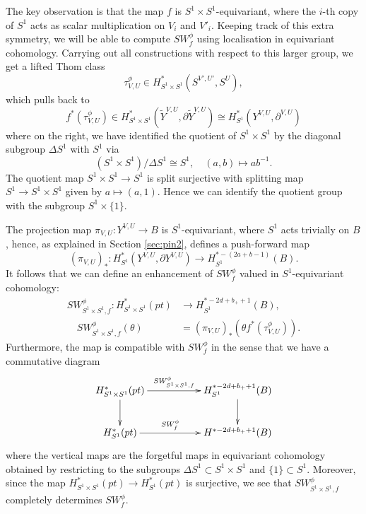 \documentclass{amsart}
\theoremstyle{definition}
\theoremstyle{remark}
\numberwithin{equation}{section}
\begin{document}
The key observation is that the map $f$ is $S^1 \times S^1$-equivariant, where the $i$-th copy of $S^1$ acts as scalar multiplication on $V_i$ and $V'_i$. Keeping track of this extra symmetry, we will be able to compute $SW_f^\phi$ using localisation in equivariant cohomology. Carrying out all constructions with respect to this larger group, we get a lifted Thom class
\[
\tau^\phi_{V,U} \in H^*_{S^1 \times S^1}( S^{V',U'} , S^{U} ),
\]
which pulls back to
\[
f^*(\tau^\phi_{V,U}) \in H^*_{S^1 \times S^1}( \widetilde{Y}^{V,U} , \partial \widetilde{Y}^{V,U}) \cong H^*_{S^1}( Y^{V,U} , \partial^{V,U})
\]
where on the right, we have identified the quotient of $S^1 \times S^1$ by the diagonal subgroup $\Delta S^1$ with $S^1$ via
\[
(S^1 \times S^1)/\Delta S^1 \cong S^1, \quad (a,b) \mapsto ab^{-1}.
\]
The quotient map $S^1 \times S^1 \to S^1$ is split surjective with splitting map $S^1 \to S^1 \times S^1$ given by $a \mapsto (a,1)$. Hence we can identify the quotient group with the subgroup $S^1 \times \{1\}$.

The projection map $\pi_{V,U} : Y^{V,U} \to B$ is $S^1$-equivariant, where $S^1$ acts trivially on $B$, hence, as explained in Section \ref{sec:pin2}, defines a push-forward map
\[
(\pi_{V,U})_* : H^*_{S^1}( Y^{V,U} , \partial Y^{V,U}) \to H_{S^1}^{*-(2a+b-1)}(B).
\]
It follows that we can define an enhancement of $SW_f^\phi$ valued in $S^1$-equivariant cohomology:
\begin{align*}
SW_{S^1 \times S^1,f}^{\phi} : H^*_{S^1 \times S^1}(pt) &\to H_{S^1}^{*-2d+b_++1}(B), \\
\quad SW_{S^1\times S^1,f}^\phi(\theta) &= (\pi_{V,U})_*( \theta f^*(\tau^\phi_{V,U})).
\end{align*}
Furthermore, the map is compatible with $SW_f^\phi$ in the sense that we have a commutative diagram
\[
\xymatrix{
H_{S^1 \times S^1}^*(pt) \ar[rr]^-{SW_{S^1 \times S^1, f}^\phi} \ar[d] & & H_{S^1}^{*-2d+b_++1}(B) \ar[d] \\
H_{S^1}^*(pt) \ar[rr]^-{SW_f^\phi} & & H^{*-2d+b_++1}(B)
}
\]
where the vertical maps are the forgetful maps in equivariant cohomology obtained by restricting to the subgroups $\Delta S^1 \subset S^1 \times S^1$ and $\{1 \} \subset S^1$. Moreover, since the map $H_{S^1 \times S^1}^*(pt) \to H_{S^1}^*(pt)$ is surjective, we see that $SW_{S^1 \times S^1,f}^\phi$ completely determines $SW_f^\phi$.
\end{document}
